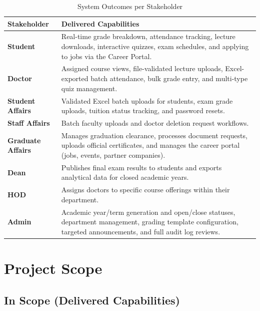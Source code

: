 \begin{table}[H]
    \centering
    \renewcommand{\arraystretch}{1.3}
    \begin{tabular}{|p{}|p{}|}
        \hline
        \textbf{Stakeholder} & \textbf{Delivered Capabilities} \\
        \hline
        \textbf{Student} & Real-time grade breakdown, attendance tracking, lecture downloads, interactive quizzes, exam schedules, and applying to jobs via the Career Portal. \\
        \hline
        \textbf{Doctor} & Assigned course views, file-validated lecture uploads, Excel-exported batch attendance, bulk grade entry, and multi-type quiz management. \\
        \hline
        \textbf{Student Affairs} & Validated Excel batch uploads for students, exam grade uploads, tuition status tracking, and password resets. \\
        \hline
        \textbf{Staff Affairs} & Batch faculty uploads and doctor deletion request workflows. \\
        \hline
        \textbf{Graduate Affairs} & Manages graduation clearance, processes document requests, uploads official certificates, and manages the career portal (jobs, events, partner companies). \\
        \hline
        \textbf{Dean} & Publishes final exam results to students and exports analytical data for closed academic years. \\
        \hline
        \textbf{HOD} & Assigns doctors to specific course offerings within their department. \\
        \hline
        \textbf{Admin} & Academic year/term generation and open/close statuses, department management, grading template configuration, targeted announcements, and full audit log reviews. \\
        \hline
    \end{tabular}
    \caption{System Outcomes per Stakeholder}
    \label{tab:outcomes}
\end{table}

\newpage
\section{Project Scope}
\label{sec:project-scope}

\subsection{In Scope (Delivered Capabilities)}
        

